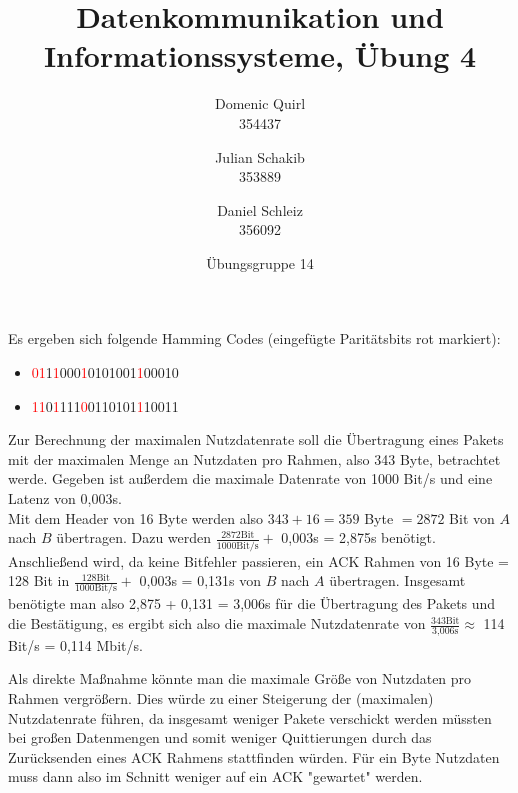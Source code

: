 \documentclass{../exercisesheet}
\title{Datenkommunikation und Informationssysteme, Übung 4}
\author{
    Domenic Quirl \\ 354437
    \and
    Julian Schakib \\ 353889
    \and 
    Daniel Schleiz \\ 356092
}
\date{Übungsgruppe 14}
\begin{document}
\maketitle
\pointtable


\begin{exercise}{1}
	Es ergeben sich folgende Hamming Codes (eingefügte Paritätsbits rot markiert):
	\begin{itemize}
	\item \textcolor{red}{01}1\textcolor{red}{1}000\textcolor{red}{1}0101001\textcolor{red}{1}00010
	\item \textcolor{red}{11}0\textcolor{red}{1}111\textcolor{red}{0}0110101\textcolor{red}{1}10011
	\end{itemize}
\end{exercise}

\begin{exercise}{4}
\begin{subexercise}
	Zur Berechnung der maximalen Nutzdatenrate soll die Übertragung eines Pakets mit der maximalen Menge an Nutzdaten pro Rahmen, also 343 Byte, betrachtet werde. Gegeben ist
	außerdem die maximale Datenrate von 1000 Bit/s und eine Latenz von 0,003s. \\
	Mit dem Header von 16 Byte werden also $343+16=359$ Byte $= 2872$ Bit von $A$ nach $B$ übertragen. Dazu werden $\frac{2872 \text{Bit}}{1000 \text{Bit/s}} +$ 0,003s 
	= 2,875s benötigt. Anschließend wird, da keine Bitfehler passieren, ein ACK Rahmen von 16 Byte = 128 Bit in $\frac{128 \text{Bit}}{1000 \text{Bit/s}} +$ 0,003s = 0,131s von
	$B$ nach $A$ übertragen. Insgesamt benötigte man also 2,875 + 0,131 = 3,006s für die Übertragung des Pakets und die Bestätigung, es ergibt sich also die maximale
	Nutzdatenrate von $\frac{343\text{Bit}}{\text{3,006s}}\approx$ 114 Bit/s = 0,114 Mbit/s.
\end{subexercise}
\begin{subexercise}
	Als direkte Maßnahme könnte man die maximale Größe von Nutzdaten pro Rahmen vergrößern. Dies würde zu einer Steigerung der (maximalen) Nutzdatenrate führen, da 
	insgesamt weniger Pakete verschickt werden müssten bei großen Datenmengen und somit weniger Quittierungen durch das Zurücksenden eines ACK Rahmens stattfinden
	würden. Für ein Byte Nutzdaten muss dann also im Schnitt weniger auf ein ACK "gewartet" werden.
\end{subexercise}
\begin{subexercise}
	
\end{subexercise}
\end{exercise}
\end{document}
